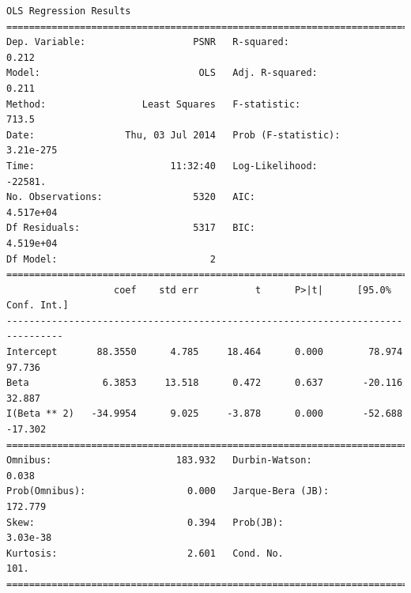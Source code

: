 \documentclass[11pt]{article}
\theoremstyle{definition}
\begin{document}
{\begin{lstlisting}[caption = Time Series 1 - Non-Local Means OLS Model - $\beta$ Only, label = {nlmeansbeta1}]
                            OLS Regression Results                            
==============================================================================
Dep. Variable:                   PSNR   R-squared:                       0.212
Model:                            OLS   Adj. R-squared:                  0.211
Method:                 Least Squares   F-statistic:                     713.5
Date:                Thu, 03 Jul 2014   Prob (F-statistic):          3.21e-275
Time:                        11:32:40   Log-Likelihood:                -22581.
No. Observations:                5320   AIC:                         4.517e+04
Df Residuals:                    5317   BIC:                         4.519e+04
Df Model:                           2                                         
================================================================================
                   coef    std err          t      P>|t|      [95.0% Conf. Int.]
--------------------------------------------------------------------------------
Intercept       88.3550      4.785     18.464      0.000        78.974    97.736
Beta             6.3853     13.518      0.472      0.637       -20.116    32.887
I(Beta ** 2)   -34.9954      9.025     -3.878      0.000       -52.688   -17.302
==============================================================================
Omnibus:                      183.932   Durbin-Watson:                   0.038
Prob(Omnibus):                  0.000   Jarque-Bera (JB):              172.779
Skew:                           0.394   Prob(JB):                     3.03e-38
Kurtosis:                       2.601   Cond. No.                         101.
==============================================================================
\end{lstlisting}

}
\end{document}
